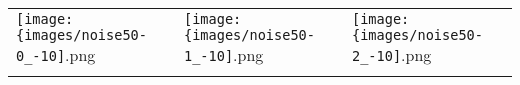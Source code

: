  \begin{tabular}{lll}
\texttt{[image: \{images/noise50-0\_-10]}.png} &\texttt{[image: \{images/noise50-1\_-10]}.png} &\texttt{[image: \{images/noise50-2\_-10]}.png} 
 \\ \hfill\end{tabular}